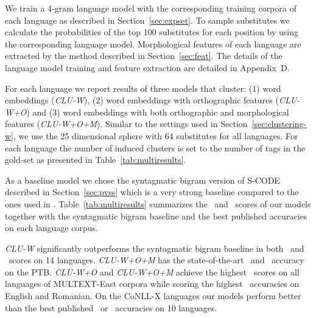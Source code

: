 We train a 4-gram language model with the corresponding training
corpora of each language as described in Section~\ref{sec:expset}.  To
sample substitutes we calculate the probabilities of the top 100
substitutes for each position by using the corresponding language
model.  Morphological features of each language are extracted by the
method described in Section~\ref{sec:feat}.  The details of the
language model training and feature extraction are detailed in
Appendix~D.

For each language we report results of three models that cluster: (1)
word embeddings ({\em CLU-W}), (2) word embeddings with orthographic
features ({\em CLU-W+O}) and (3) word embeddings with both orthographic
and morphological features ({\em CLU-W+O+M}).  Similar to the settings
used in Section~\ref{sec:clustering-w}, we use the 25 dimensional
sphere with 64 substitutes for all languages.  For each language the
number of induced clusters is set to the number of tags in the
gold-set as presented in Table~\ref{tab:multiresults}.

As a baseline model we chose the syntagmatic bigram version of S-CODE
described in Section~\ref{sec:pvss} which is a very strong baseline
compared to the ones used in
\cite{christodoulopoulos-goldwater-steedman:2011:EMNLP}.
Table~\ref{tab:multiresults} summarizes the \mto\ and \vm\ scores of
our models together with the syntagmatic bigram baseline and the best
published accuracies on each language corpus.

{\em CLU-W} significantly outperforms the syntagmatic bigram baseline
in both \mto\ and \vm\ scores on 14 languages.  {\em CLU-W+O+M} has
the state-of-the-art \mto\ and \vm\ accuracy on the PTB.  {\em
  CLU-W+O} and {\em CLU-W+O+M} achieve the highest \mto\ scores on all
languages of MULTEXT-East corpora while scoring the highest \vm\
accuracies on English and Romanian.  On the CoNLL-X languages our
models perform better than the best published \mto\ or \vm\ accuracies
on 10 languages.

